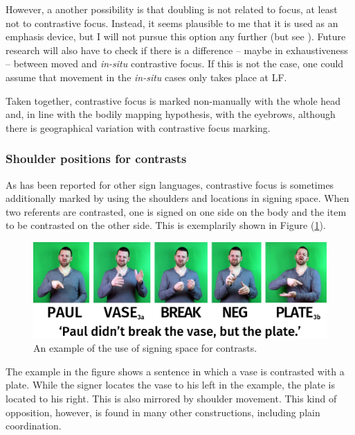 \noindent However, a another possibility is that doubling is not related to focus, at least not to contrastive focus. Instead, it seems plausible to me that it is used as an emphasis device, but I will not pursue this option any further (but see \citealt{wilbur2012informationstructure}). Future research will also have to check if there is a difference -- maybe in exhaustiveness -- between moved and \textit{in-situ} contrastive focus. If this is not the case, one could assume that movement in the \textit{in-situ} cases only takes place at LF.

Taken together, contrastive focus is marked non-manually with the whole head and, in line with the bodily mapping hypothesis, with the eyebrows, although there is geographical variation with contrastive focus marking.

\subsubsection{Shoulder positions for contrasts}
As has been reported for other sign languages, contrastive focus is sometimes additionally marked by using the shoulders and locations in signing space. When two referents are contrasted, one is signed on one side on the body and the item to be contrasted on the other side. This is exemplarily shown in Figure (\ref{contrastiveshoulders}).


\begin{figure}[bt]
\centering
	\includegraphics[width=1.0\textwidth]{contrastiveshoulders.jpg}
	\caption{An example of the use of signing space for contrasts.}
	\label{contrastiveshoulders}
\end{figure}

The example in the figure shows a sentence in which a vase is contrasted with a plate. While the signer locates the vase to his left in the example, the plate is located to his right. This is also mirrored by shoulder movement. This kind of opposition, however, is found in many other constructions, including plain coordination. 



